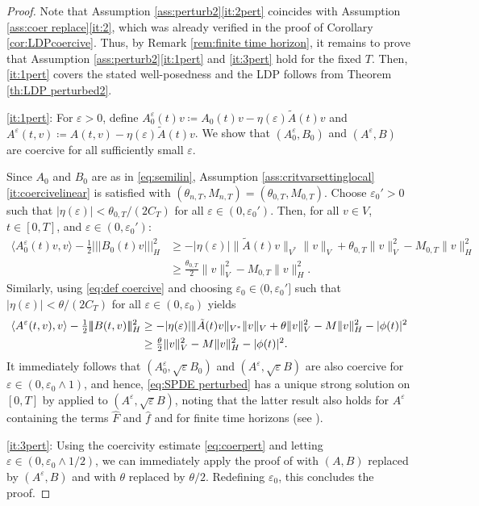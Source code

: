 \documentclass{amsart}
\newcommand{\<}{\langle}
\newcommand{\?}{\rangle}
\newcommand{\nn}{|\!|\!|}
\newcommand{\ceqq}{\coloneqq}
\theoremstyle{plain}
\theoremstyle{remark}
\theoremstyle{plain}
\numberwithin{equation}{section}
\newcommand{\eps}{\varepsilon}
\begin{document}
\begin{proof} 
Note that Assumption \ref{ass:perturb2}\ref{it:2pert} coincides with Assumption \ref{ass:coer replace}\ref{it:2}, which was already verified in the proof of Corollary \ref{cor:LDPcoercive}. 
Thus, by Remark \ref{rem:finite time horizon}, it remains to prove that Assumption \ref{ass:perturb2}\ref{it:1pert} and \ref{it:3pert} hold for the fixed $T$. Then, \ref{it:1pert} covers the stated well-posedness and the LDP follows from Theorem \ref{th:LDP perturbed2}.  

\ref{it:1pert}: For  $\eps>0$,  
define $A_0^\eps(t)v\ceqq A_0(t)v-\eta(\eps)\tilde{A}(t)v$ and $A^\eps(t,v)\ceqq A(t,v)-\eta(\eps)\tilde{A}(t)v$. 
We show that $(A_0^\eps, B_0)$ and $(A^\eps, B)$ are coercive for all sufficiently small $\eps$. 
 
Since $A_0$ and $B_0$ are as in \eqref{eq:semilin}, Assumption \ref{ass:critvarsettinglocal}\ref{it:coercivelinear} is satisfied with $(\theta_{n,T},M_{n,T})= (\theta_{0,T},M_{0,T})$.  
Choose $\eps_0'>0$ such that $|\eta(\eps)|<\theta_{0,T}/(2C_{T})$ for all $\eps\in(0,\eps_0')$.  
Then, for all $v\in V$, $t\in[0,T]$, and $\eps\in(0,\eps_0')$:
 \begin{align*}
  \<A_0^\eps(t)v,v\?-\tfrac{1}{2}\nn   B_0(t)v\nn_H^2 
  &\geq -|\eta(\eps)|\|\tilde{A}(t)v\|_{V^*}\|v\|_V+\theta_{0,T}\|v\|_V^2-M_{0,T}\|v\|_H^2 \\
  &\geq \tfrac{\theta_{0,T}}{2}\|v\|_V^2-M_{0,T}\|v\|_H^2. 
  \end{align*}
  Similarly, using \eqref{eq:def coercive} and choosing $\eps_0\in(0,\eps_0']$ such that $|\eta(\eps)|<\theta/(2C_{T})$ for all $\eps\in(0,\eps_0)$ yields 
  \begin{align}\label{eq:coerpert}
  \<A^\eps(t,v),v\?-\tfrac{1}{2}\nn   B(t,v)\nn_H^2 
  &\geq -|\eta(\eps)|\|\tilde{A}(t)v\|_{V^*}\|v\|_V +\theta \|v\|_V^2-M \|v\|_H^2-|\phi(t)|^2\notag\\
  &\geq \tfrac{\theta }{2}\|v\|_V^2-M \|v\|_H^2-|\phi(t)|^2.
  \end{align}
It immediately follows that $(A_0^\eps, \sqrt{\eps}B_0)$ and $(A^\eps, \sqrt{\eps}B)$ are also coercive for $\eps\in(0,\eps_0\wedge 1)$, and hence, \eqref{eq:SPDE perturbed} has a unique strong solution on $[0,T]$ by \cite[Th.\ 3.5]{AV22variational} applied to $(A^\eps,\sqrt{\eps}B)$, noting that the latter result also holds for $A^\eps$ containing the terms $\hat{F}$ and $\hat{f}$ and for finite time horizons (see \cite[Th.\ 7.1, Rem.\ 7.2]{BGV}). 
 
\ref{it:3pert}: Using the coercivity estimate \eqref{eq:coerpert} and letting $\eps\in(0,\eps_0\wedge 1/2)$, we can immediately apply the 
  proof of \cite[Lem.\ 4.11]{TV24} with $(A,B)$ replaced by $(A^\eps,B)$ and with $\theta$ replaced by ${\theta}/{2}$.  Redefining $\eps_0$, this concludes the proof. 
\end{proof} 
\end{document}
